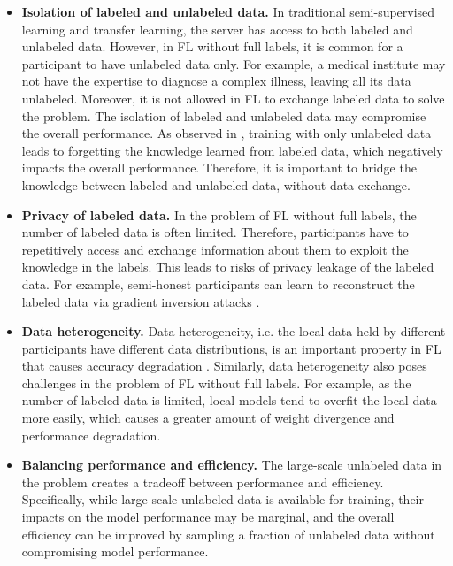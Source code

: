 \documentclass[11pt]{article}
\begin{document}
\begin{itemize}
    \item \textbf{Isolation of labeled and unlabeled data.} In traditional semi-supervised learning and transfer learning, the server has access to both labeled and unlabeled data. However, in FL without full labels, it is common for a participant to have unlabeled data only. For example, a medical institute may not have the expertise to diagnose a complex illness, leaving all its data unlabeled. Moreover, it is not allowed in FL to exchange labeled data to solve the problem. The isolation of labeled and unlabeled data may compromise the overall performance. As observed in \cite{Yilun-diao2022semifl,Yilun-jeong2021federated}, training with only unlabeled data leads to forgetting the knowledge learned from labeled data, which negatively impacts the overall performance. Therefore, it is important to bridge the knowledge between labeled and unlabeled data, without data exchange.
    \item \textbf{Privacy of labeled data.} In the problem of FL without full labels, the number of labeled data is often limited. Therefore, participants have to repetitively access and exchange information about them to exploit the knowledge in the labels. This leads to risks of privacy leakage of the labeled data. For example, semi-honest participants can learn to reconstruct the labeled data via gradient inversion attacks \cite{Yilun-geiping2020inverting}.
    \item \textbf{Data heterogeneity.} Data heterogeneity, i.e. the local data held by different participants have different data distributions, is an important property in FL that causes accuracy degradation \cite{Yilun-li2020federated,Yilun-lai2021oort}. Similarly, data heterogeneity also poses challenges in the problem of FL without full labels. For example, as the number of labeled data is limited, local models tend to overfit the local data more easily, which causes a greater amount of weight divergence \cite{Yilun-zhao2018federated} and performance degradation.
    \item \textbf{Balancing performance and efficiency.} The large-scale unlabeled data in the problem creates a tradeoff between performance and efficiency. Specifically, while large-scale unlabeled data is available for training, their impacts on the model performance may be marginal, and the overall efficiency can be improved by sampling a fraction of unlabeled data without compromising model performance.
\end{itemize}
\end{document}
